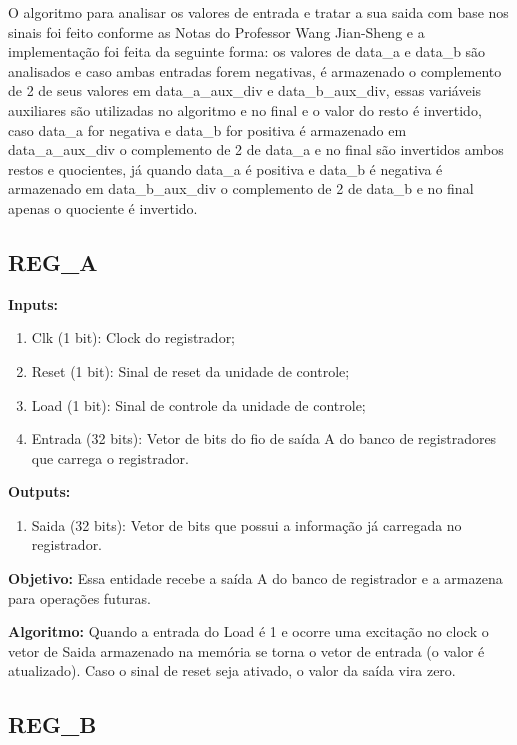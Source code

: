O algoritmo para analisar os valores de entrada e tratar a sua saida com base nos sinais foi feito conforme as Notas do Professor Wang Jian-Sheng \cite{notasprofessor} e a implementação foi feita da seguinte forma: os valores de data\_a e data\_b são analisados e caso ambas entradas forem negativas, é armazenado o complemento de 2 de seus valores em data\_a\_aux\_div e data\_b\_aux\_div, essas variáveis auxiliares são utilizadas no algoritmo e no final e o valor do resto é invertido, caso data\_a for negativa e data\_b for positiva é armazenado em data\_a\_aux\_div o complemento de 2 de data\_a e no final são invertidos ambos restos e quocientes, já quando data\_a é positiva e data\_b é negativa é armazenado em data\_b\_aux\_div o complemento de 2 de data\_b e no final apenas o quociente é invertido.

\newpage

\subsection{REG\_A}

\textbf{Inputs:}

\begin{enumerate}
    \item Clk (1 bit): Clock do registrador;
    \item Reset (1 bit): Sinal de reset da unidade de controle;
    \item Load (1 bit): Sinal de controle da unidade de controle;
    \item Entrada (32 bits): Vetor de bits do fio de saída A do banco de registradores que carrega o registrador.
\end{enumerate}

\textbf{Outputs:}

\begin{enumerate}
    \item Saida (32 bits): Vetor de bits que possui a informação já carregada no registrador.
\end{enumerate}

\textbf{Objetivo:} Essa entidade recebe a saída A do banco de registrador e a armazena para operações futuras.

\textbf{Algoritmo:} Quando a entrada do Load é 1 e ocorre uma excitação no clock o vetor de Saida armazenado na memória se torna o vetor de entrada (o valor é atualizado). Caso o sinal de reset seja ativado, o valor da saída vira zero.

\subsection{REG\_B}

